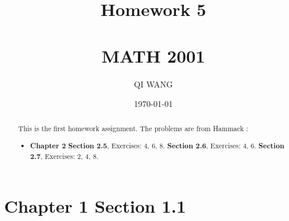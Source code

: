 \documentclass[12pt]{amsart}
\numberwithin{equation}{section}
\theoremstyle{definition}
\theoremstyle{remark}
\begin{document}




\author[QI]{QI WANG}
\address{University of Colorado, Department of Mathematics,  Campus Box 395,
Boulder, CO 80309-0395}
\date{\today}



\title[Homework 5]{Homework 5 \\ \ \\  MATH 2001}

\begin{abstract} 
This is the first homework assignment.  The problems are from Hammack \cite[Ch.~2, \S 2.5]{H13}:
\begin{itemize}

\item \textbf{Chapter 2}  
\textbf{Section 2.5}, Exercises:  4, 6, 8.
\textbf{Section 2.6}, Exercises:  4, 6.
\textbf{Section 2.7}, Exercises:  2, 4, 8.

\end{itemize}
\end{abstract}


\maketitle


\tableofcontents





\section*{Chapter 1 Section 1.1}


\end{document}
